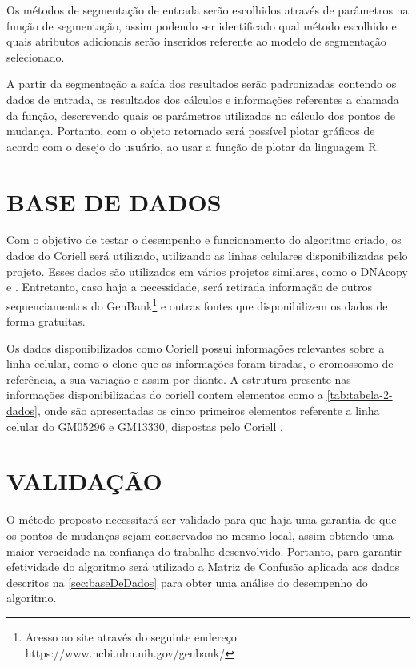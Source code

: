 Os métodos de segmentação de entrada serão escolhidos através de parâmetros na função de segmentação, assim podendo ser identificado qual método escolhido e quais atributos adicionais serão inseridos referente ao modelo de segmentação selecionado.

A partir da segmentação a saída dos resultados serão padronizadas contendo os dados de entrada, os resultados dos cálculos e informações referentes a chamada da função, descrevendo quais os parâmetros utilizados no cálculo dos pontos de mudança. Portanto, com o objeto retornado será possível plotar gráficos de acordo com o desejo do usuário, ao usar a função de plotar da linguagem R.

\section{BASE DE DADOS} 
\label{sec:baseDeDados} 

Com o objetivo de testar o desempenho e funcionamento do algoritmo criado, os dados do Coriell \cite{Snijders2001} será utilizado, utilizando as linhas celulares disponibilizadas pelo projeto. Esses dados são utilizados em vários projetos similares, como o DNAcopy \cite{Olshen2004} e \cite{Girimurugan2018}. Entretanto, caso haja a necessidade, será retirada informação de outros sequenciamentos do GenBank\footnote{Acesso ao site através do seguinte endereço https://www.ncbi.nlm.nih.gov/genbank/} e outras fontes que disponibilizem os dados de forma gratuitas.

Os dados disponibilizados como Coriell possui informações relevantes sobre a linha celular, como o clone que as informações foram tiradas, o cromossomo de referência, a sua variação e assim por diante. A estrutura presente nas informações disponibilizadas do coriell contem elementos como a \autoref{tab:tabela-2-dados}, onde são apresentadas os cinco primeiros elementos referente a linha celular do GM05296 e GM13330, dispostas pelo Coriell \cite{Snijders2001}.



\section{VALIDAÇÃO} 

O método proposto necessitará ser validado para que haja uma garantia de que os pontos de mudanças sejam conservados no mesmo local, assim obtendo uma maior veracidade na confiança do trabalho desenvolvido. Portanto, para garantir efetividade do algoritmo será utilizado a Matriz de Confusão aplicada aos dados descritos na \autoref{sec:baseDeDados} para obter uma análise do desempenho do algoritmo.